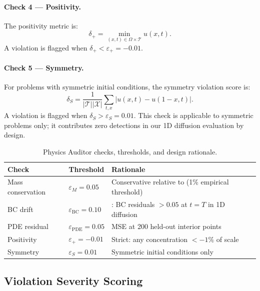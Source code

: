 \documentclass{article}
\begin{document}
\paragraph{Check 4 --- Positivity.}
The positivity metric is:
\begin{equation}
  \delta_+ = \min_{(x,t)\in\Omega\times\mathcal{T}} u(x,t).
\end{equation}
A violation is flagged when $\delta_+ < \varepsilon_+ = -0.01$.

\paragraph{Check 5 --- Symmetry.}
For problems with symmetric initial conditions, the symmetry violation score is:
\begin{equation}
  \delta_S = \frac{1}{|\mathcal{T}||\mathcal{X}|}
    \sum_{t,x} |u(x,t) - u(1-x,t)|.
\end{equation}
A violation is flagged when $\delta_S > \varepsilon_S = 0.01$.
This check is applicable to symmetric problems only; it contributes zero
detections in our 1D diffusion evaluation by design.

\begin{table}[t]
  \caption{Physics Auditor checks, thresholds, and design rationale.}
  \label{tab:checks}
  \centering
  \begin{tabular}{llp{6cm}}
    \toprule
    Check & Threshold & Rationale \\
    \midrule
    Mass conservation & $\varepsilon_M = 0.05$ &
      Conservative relative to \citet{Beucler2021Enforcing} (1\% empirical threshold) \\
    BC drift & $\varepsilon_\text{BC} = 0.10$ &
      \citet{Wang2022WhenPINNsFail}: BC residuals $>0.05$ at $t=T$ in 1D diffusion \\
    PDE residual & $\varepsilon_\text{PDE} = 0.05$ &
      MSE at 200 held-out interior points \\
    Positivity & $\varepsilon_+ = -0.01$ &
      Strict: any concentration $< -1\%$ of scale \\
    Symmetry & $\varepsilon_S = 0.01$ &
      Symmetric initial conditions only \\
    \bottomrule
  \end{tabular}
\end{table}

\subsection{Violation Severity Scoring}
\end{document}
